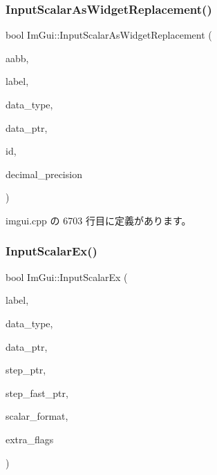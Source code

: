 \subsubsection{\texorpdfstring{Input\+Scalar\+As\+Widget\+Replacement()}{InputScalarAsWidgetReplacement()}}
{\footnotesize\ttfamily bool Im\+Gui\+::\+Input\+Scalar\+As\+Widget\+Replacement (\begin{DoxyParamCaption}\item[{const \mbox{\hyperlink{struct_im_rect}{Im\+Rect}} \&}]{aabb,  }\item[{const char $\ast$}]{label,  }\item[{\mbox{\hyperlink{imgui__internal_8h_a22f27475affc8d8a1f2407887e5e1d19}{Im\+Gui\+Data\+Type}}}]{data\+\_\+type,  }\item[{void $\ast$}]{data\+\_\+ptr,  }\item[{\mbox{\hyperlink{imgui_8h_a1785c9b6f4e16406764a85f32582236f}{Im\+Gui\+ID}}}]{id,  }\item[{int}]{decimal\+\_\+precision }\end{DoxyParamCaption})}



 imgui.\+cpp の 6703 行目に定義があります。

\mbox{\label{namespace_im_gui_a08c243542b1678859cf0e065f9e43865}} 
\subsubsection{\texorpdfstring{Input\+Scalar\+Ex()}{InputScalarEx()}}
{\footnotesize\ttfamily bool Im\+Gui\+::\+Input\+Scalar\+Ex (\begin{DoxyParamCaption}\item[{const char $\ast$}]{label,  }\item[{\mbox{\hyperlink{imgui__internal_8h_a22f27475affc8d8a1f2407887e5e1d19}{Im\+Gui\+Data\+Type}}}]{data\+\_\+type,  }\item[{void $\ast$}]{data\+\_\+ptr,  }\item[{void $\ast$}]{step\+\_\+ptr,  }\item[{void $\ast$}]{step\+\_\+fast\+\_\+ptr,  }\item[{const char $\ast$}]{scalar\+\_\+format,  }\item[{\mbox{\hyperlink{imgui_8h_a7d2c6153a6b9b5d3178ce82434ac9fb8}{Im\+Gui\+Input\+Text\+Flags}}}]{extra\+\_\+flags }\end{DoxyParamCaption})}




